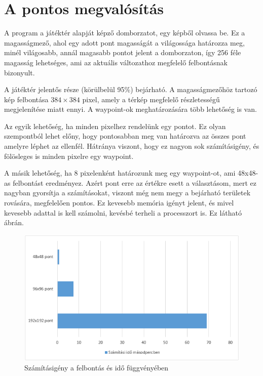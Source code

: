 \section{A pontos megvalósítás}

A program a játéktér alapját képző domborzatot, egy képből olvassa be. Ez a magasságmező, ahol egy adott pont magasságát a világossága határozza meg, minél világosabb, annál magasabb pontot jelent a domborzaton, így 256 féle magasság lehetséges, ami az aktuális változathoz megfelelő felbontásnak bizonyult. 

A játéktér jelentős része (körülbelül 95\%) bejárható. A magasságmezőhöz tartozó kép felbontása $384 \times 384$ pixel, amely a térkép megfelelő részletességű megjelenítése miatt ennyi. A waypoint-ok meghatározására több lehetőség is van.

Az egyik lehetőség, ha minden pixelhez rendelünk egy pontot. Ez olyan szempontból lehet előny, hogy pontosabban meg van határozva az összes pont amelyre léphet az ellenfél. Hátránya viszont, hogy ez nagyon sok számításigény, és fölösleges is minden pixelre egy waypoint.

A másik lehetőség, ha 8 pixelenként határozunk meg egy waypoint-ot, ami 48x48-as felbontást eredményez. Azért pont erre az értékre esett a választásom, mert ez nagyban gyorsítja a számításokat, viszont még nem megy a bejárható területek rovására, megfelelően pontos. Ez kevesebb memória igényt jelent, és mivel kevesebb adattal is kell számolni, kevésbé terheli a processzort is. Ez látható  ábrán.

\begin{figure}[h]
\centering
\includegraphics[scale=0.9]{kepek/utvonal_szamitas_diagram_waypointokra.png}
\caption{Számításigény a felbontás és idő függvényében}
\label{fig:diagram_utvonal}
\end{figure}

